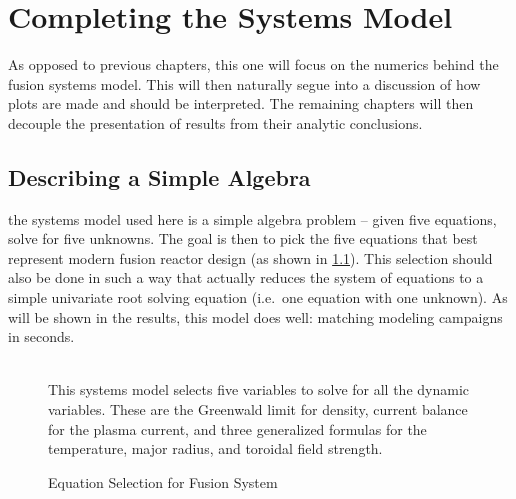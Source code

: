 %
%
%
%
%
%
%
%


\chapter{Completing the Systems Model}

\label{chapter:complete}

As opposed to previous chapters, this one will focus on the numerics behind the fusion systems model.   This will then naturally segue into a discussion of how plots are made and should be interpreted. The remaining chapters will then decouple the presentation of results from their analytic conclusions.

\section{Describing a Simple Algebra}

 the systems model used here is a simple algebra problem -- given five equations, solve for five unknowns. The goal is then to pick the five equations that best represent modern fusion reactor design (as shown in \cref{fig:equation_breakdown}). This selection should also be done in such a way that actually reduces the system of equations to a simple univariate root solving equation (i.e.\ one equation with one unknown). As will be shown in the results, this model does  well: matching  modeling campaigns in seconds.

\begin{figure}
	\centering
	\begin{adjustbox}{width=0.75\textwidth}
		
	\end{adjustbox}
	\caption{Equation Selection for Fusion System} ~\\
	\small This systems model selects five variables to solve for all the dynamic variables. These are the Greenwald limit for density, current balance for the plasma current, and three generalized formulas for the temperature, major radius, and toroidal field strength.
	\label{fig:equation_breakdown}
\end{figure}

